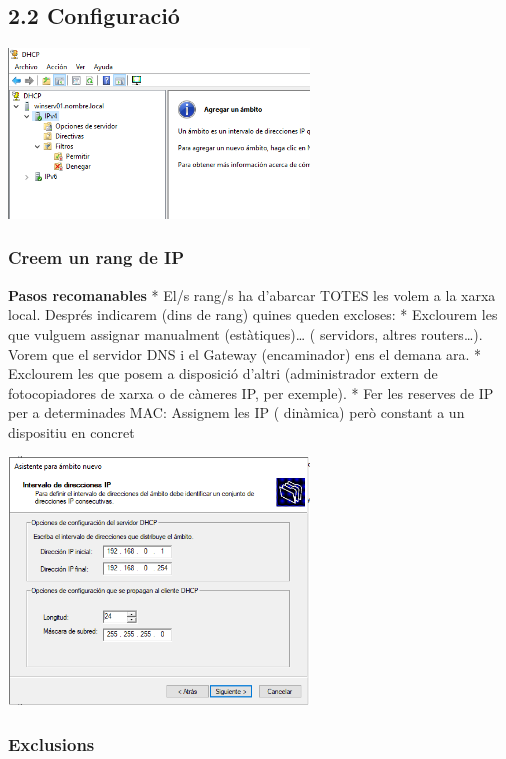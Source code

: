 \documentclass[
  a4paper,
]{article}
\begin{document}
\subsection{2.2 Configuració}\label{configuraciuxf3}

\includegraphics[width=0.6\textwidth,height=\textheight]{png/DHCP7.png}

\subsubsection{Creem un rang de IP}\label{creem-un-rang-de-ip}

\textbf{Pasos recomanables} * El/s rang/s ha d'abarcar TOTES les volem a
la xarxa local. Després indicarem (dins de rang) quines queden excloses:
* Exclourem les que vulguem assignar manualment (estàtiques)\ldots{} (
servidors, altres routers\ldots). Vorem que el servidor DNS i el Gateway
(encaminador) ens el demana ara. * Exclourem les que posem a disposició
d'altri (administrador extern de fotocopiadores de xarxa o de càmeres
IP, per exemple). * Fer les reserves de IP per a determinades MAC:
Assignem les IP ( dinàmica) però constant a un dispositiu en concret

\includegraphics[width=0.6\textwidth,height=\textheight]{png/DHCP8.png}

\subsubsection{Exclusions}\label{exclusions}
\end{document}

